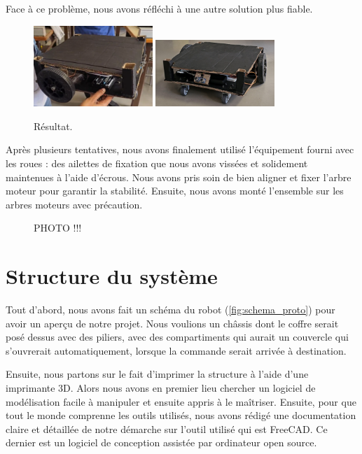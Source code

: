 \documentclass[a4paper,12pt]{report}  %
\begin{document}
Face à ce problème, nous avons réfléchi à une autre solution plus fiable.

\begin{figure}[H]
	\centering
	\includegraphics[width=0.4\textwidth]{./attachments/proto-photo-1.png}
	\includegraphics[width=0.4\textwidth]{./attachments/proto-photo-2.png}
	\caption{Résultat.}
\end{figure}

Après plusieurs tentatives, nous avons finalement utilisé l’équipement fourni avec les roues : des ailettes de fixation que nous avons vissées et solidement maintenues à l’aide d’écrous. Nous avons pris soin de bien aligner et fixer l’arbre moteur pour garantir la stabilité. Ensuite, nous avons monté l’ensemble sur les arbres moteurs avec précaution.


\begin{figure}[H]
	\centering
	\caption{PHOTO !!!}
\end{figure}


\section{Structure du système}

Tout d’abord, nous avons fait un schéma du robot (\autoref{fig:schema_proto}) pour avoir un aperçu de notre projet. Nous voulions un châssis dont le coffre serait posé dessus avec des piliers, avec des compartiments qui aurait un couvercle qui s'ouvrerait automatiquement, lorsque la commande serait arrivée à destination. 

Ensuite, nous partons sur le fait d’imprimer la structure à l’aide d’une imprimante 3D. Alors nous avons en premier lieu chercher un logiciel de modélisation facile à manipuler et ensuite appris à le maîtriser. Ensuite, pour que tout le monde comprenne les outils utilisés, nous avons rédigé une documentation claire et détaillée de notre démarche sur l'outil utilisé qui est FreeCAD. Ce dernier est un logiciel de conception assistée par ordinateur open source.
\end{document}
